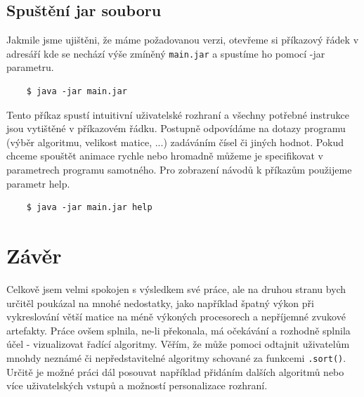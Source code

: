 \documentclass{article}
\begin{document}
\subsection{Spuštění jar souboru}
Jakmile jsme ujištěni, že máme požadovanou verzi, otevřeme si příkazový řádek v adresáří kde se nechází výše zmíněný \verb|main.jar| a spustíme ho pomocí -jar parametru.
\begin{verbatim}
    $ java -jar main.jar
\end{verbatim}
Tento příkaz spustí intuitivní uživatelské rozhraní a všechny potřebné instrukce jsou vytištěné v příkazovém řádku. Postupně odpovídáme na dotazy programu (výběr algoritmu, velikost matice, ...) zadáváním čísel či jiných hodnot.
Pokud chceme spouštět animace rychle nebo hromadně můžeme je specifikovat v parametrech programu samotného. Pro zobrazení návodů k příkazům použijeme parametr help.
\begin{verbatim}
    $ java -jar main.jar help
\end{verbatim}

\section{Závěr}
Celkově jsem velmi spokojen s výsledkem své práce, ale na druhou stranu bych určitěl poukázal na mnohé nedostatky, jako například špatný výkon při vykreslování větší matice na méně výkoných procesorech a nepříjemné zvukové artefakty. Práce ovšem splnila, ne-li překonala, má očekávání a rozhodně splnila účel - vizualizovat řadící algoritmy. Věřím, že může pomoci odtajnit uživatelům mnohdy neznámé či nepředstavitelné algoritmy schované za funkcemi \verb|.sort()|. Určitě je možné práci dál posouvat například přidáním dalších algoritmů nebo více uživatelských vstupů a možností personalizace rozhraní.
\end{document}
